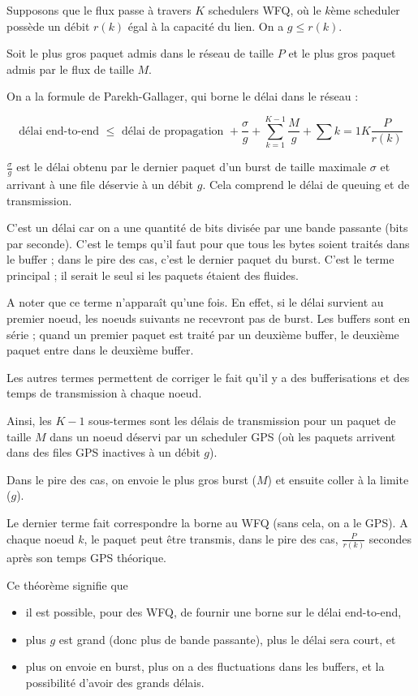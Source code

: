 \documentclass[10pt,a4paper]{report}
\begin{document}
			Supposons que le flux passe à travers $K$ schedulers WFQ, où le $k$ème scheduler possède un débit $r(k)$ égal à la capacité du lien. On a $g \leq r(k)$.
			
			Soit le plus gros paquet admis dans le réseau de taille $P$ et le plus gros paquet admis par le flux de taille $M$.
			
			On a la formule de Parekh-Gallager, qui borne le délai dans le réseau :
			
			$$\text{délai end-to-end } \leq  \text{ délai de propagation } + \frac{\sigma}{g} + \sum_{k = 1}^{K - 1} \frac{M}{g} + \sum{k = 1}{K} \frac{P}{r(k)}$$
		
			$\frac{\sigma}{g}$ est le délai obtenu par le dernier paquet d'un burst de taille maximale $\sigma$ et arrivant à une file déservie à un débit $g$. Cela comprend le délai de queuing et de transmission.
			
			C'est un délai car on a une quantité de bits divisée par une bande passante (bits par seconde). C'est le temps qu'il faut pour que tous les bytes soient traités dans le buffer ; dans le pire des cas, c'est le dernier paquet du burst. C'est le terme principal ; il serait le seul si les paquets étaient des fluides.
			
			A noter que ce terme n'apparaît qu'une fois. En effet, si le délai survient au premier noeud, les noeuds suivants ne recevront pas de burst. Les buffers sont en série ; quand un premier paquet est traité par un deuxième buffer, le deuxième paquet entre dans le deuxième buffer.			
			
			Les autres termes permettent de corriger le fait qu'il y a des bufferisations et des temps de transmission à chaque noeud.
			
			Ainsi, les $K - 1$ sous-termes sont les délais de transmission pour un paquet de taille $M$ dans un noeud déservi par un scheduler GPS (où les paquets arrivent dans des files GPS inactives à un débit $g$).
			
			Dans le pire des cas, on envoie le plus gros burst ($M$) et ensuite coller à la limite ($g$).
			
			Le dernier terme fait correspondre la borne au WFQ (sans cela, on a le GPS). A chaque noeud $k$, le paquet peut être transmis, dans le pire des cas, $\frac{P}{r(k)}$ secondes après son temps GPS théorique.
		
		
			Ce théorème signifie que
			
			\begin{itemize}
				\item il est possible, pour des WFQ, de fournir une borne sur le délai end-to-end,
				\item plus $g$ est grand (donc plus de bande passante), plus le délai sera court, et
				\item plus on envoie en burst, plus on a des fluctuations dans les buffers, et la possibilité d'avoir des grands délais.
			\end{itemize}
			
\end{document}

